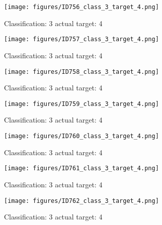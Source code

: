 \begin{figure}[h!]
\begin{center}
\texttt{[image: figures/ID756\_class\_3\_target\_4.png]}
\end{center}
\caption{ Classification: 3 actual target: 4}
\label{fig:ID756_class_3_target_4}
\end{figure}
\begin{figure}[h!]
\begin{center}
\texttt{[image: figures/ID757\_class\_3\_target\_4.png]}
\end{center}
\caption{ Classification: 3 actual target: 4}
\label{fig:ID757_class_3_target_4}
\end{figure}
\begin{figure}[h!]
\begin{center}
\texttt{[image: figures/ID758\_class\_3\_target\_4.png]}
\end{center}
\caption{ Classification: 3 actual target: 4}
\label{fig:ID758_class_3_target_4}
\end{figure}
\begin{figure}[h!]
\begin{center}
\texttt{[image: figures/ID759\_class\_3\_target\_4.png]}
\end{center}
\caption{ Classification: 3 actual target: 4}
\label{fig:ID759_class_3_target_4}
\end{figure}
\begin{figure}[h!]
\begin{center}
\texttt{[image: figures/ID760\_class\_3\_target\_4.png]}
\end{center}
\caption{ Classification: 3 actual target: 4}
\label{fig:ID760_class_3_target_4}
\end{figure}
\begin{figure}[h!]
\begin{center}
\texttt{[image: figures/ID761\_class\_3\_target\_4.png]}
\end{center}
\caption{ Classification: 3 actual target: 4}
\label{fig:ID761_class_3_target_4}
\end{figure}
\begin{figure}[h!]
\begin{center}
\texttt{[image: figures/ID762\_class\_3\_target\_4.png]}
\end{center}
\caption{ Classification: 3 actual target: 4}
\label{fig:ID762_class_3_target_4}
\end{figure}
